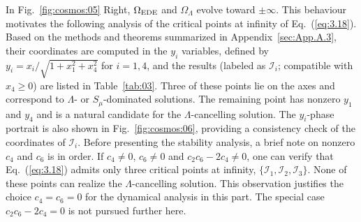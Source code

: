 \documentclass[aps,prd,twocolumn]{revtex4-2}
\newcommand\subEDE{{\rm EDE}}
\begin{document}
In Fig.~\ref{fig:cosmos:05} Right, $\Omega_\subEDE$ and $\Omega_\Lambda$ evolve toward $\pm\infty$. This behaviour motivates the following analysis of the critical points at infinity of Eq.~(\ref{eq:3.18}). Based on the methods and theorems summarized in Appendix~\ref{sec:App.A.3}, their coordinates are computed in the $y_i$ variables, defined by $y_i=x_i/\sqrt{1+x_1^2+x_4^2}$ for $i=1,4$, and the results (labeled as $\mathcal{I}_i$; compatible with $x_4\geqslant0$) are listed in Table~\ref{tab:03}. Three of these points lie on the axes and correspond to $\Lambda$- or $S_\mu$-dominated solutions. The remaining point has nonzero $y_1$ and $y_4$ and is a natural candidate for the $\Lambda$-cancelling solution. The $y_i$-phase portrait is also shown in Fig.~\ref{fig:cosmos:06}, providing a consistency check of the coordinates of $\mathcal{I}_i$. Before presenting the stability analysis, a brief note on nonzero $c_4$ and $c_6$ is in order. If $c_4\neq0$, $c_6\neq0$ and $c_2c_6-2c_4\neq0$, one can verify that Eq.~(\ref{eq:3.18}) admits only three critical points at infinity, $\{\mathcal{I}_1,\mathcal{I}_2,\mathcal{I}_3\}$. None of these points can realize the $\Lambda$-cancelling solution. This observation justifies the choice $c_4=c_6=0$ for the dynamical analysis in this part. The special case $c_2c_6-2c_4=0$ is not pursued further here.
\end{document}
